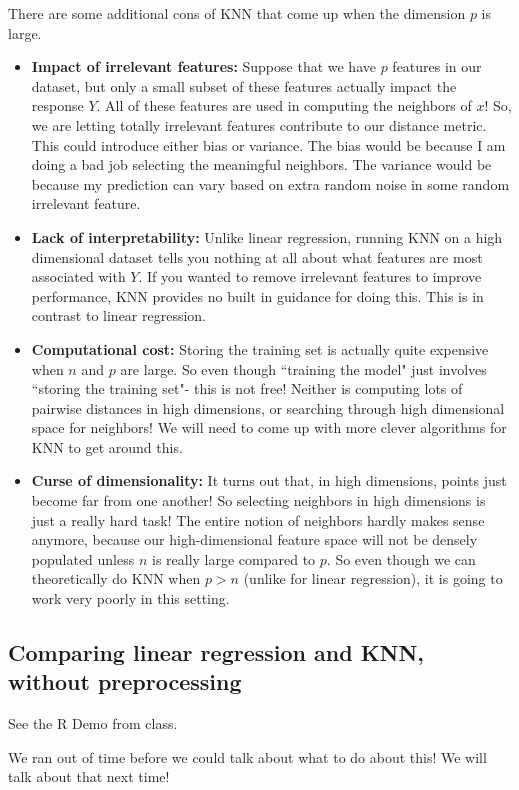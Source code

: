 There are some additional cons of KNN that come up when the dimension $p$ is large. 
\begin{itemize}
\item \textbf{Impact of irrelevant features:} Suppose that we have $p$ features in our dataset, but only a small subset of these features actually impact the response $Y$. All of these features are used in computing the neighbors of $x$! So, we are letting totally irrelevant features contribute to our distance metric. This could introduce either bias or variance. The bias would be because I am doing a bad job selecting the meaningful neighbors. The variance would be because my prediction can vary based on extra random noise in some random irrelevant feature. 
\item \textbf{Lack of interpretability:} Unlike linear regression, running KNN on a high dimensional dataset tells you nothing at all about what features are most associated with $Y$. If you wanted to remove irrelevant features to improve performance, KNN provides no built in guidance for doing this. This is in contrast to linear regression. 
\item \textbf{Computational cost:} Storing the training set is actually quite expensive when $n$ and $p$ are large. So even though ``training the model" just involves ``storing the training set"- this is not free! Neither is computing lots of pairwise distances in high dimensions, or searching through high dimensional space for neighbors! We will need to come up with more clever algorithms for KNN to get around this. 
\item \textbf{Curse of dimensionality:} It turns out that, in high dimensions, points just become far from one another! So selecting neighbors in high dimensions is just a really hard task! The entire notion of neighbors hardly makes sense anymore, because our high-dimensional feature space will not be densely populated unless $n$ is really large compared to $p$.  So even though we can theoretically do KNN when $p > n$ (unlike for linear regression), it is going to work very poorly in this setting. 
\end{itemize}


\subsection{Comparing linear regression and KNN, without preprocessing}

See the R Demo from class.

We ran out of time before we could talk about what to do about this! We will talk about that next time!


















